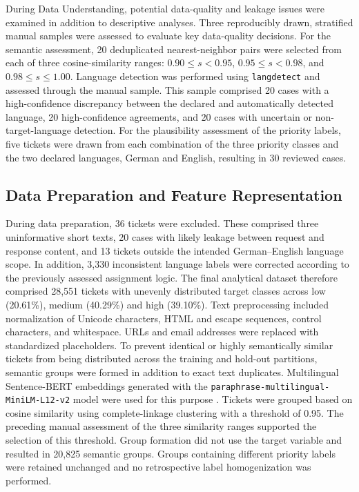 During Data Understanding, potential data-quality and leakage issues were examined in addition to descriptive analyses. Three reproducibly drawn, stratified manual samples were assessed to evaluate key data-quality decisions. For the semantic assessment, 20 deduplicated nearest-neighbor pairs were selected from each of three cosine-similarity ranges: $0.90 \leq s < 0.95$, $0.95 \leq s < 0.98$, and $0.98 \leq s \leq 1.00$. Language detection was performed using \texttt{langdetect} and assessed through the manual sample. This sample comprised 20 cases with a high-confidence discrepancy between the declared and automatically detected language, 20 high-confidence agreements, and 20 cases with uncertain or non-target-language detection. For the plausibility assessment of the priority labels, five tickets were drawn from each combination of the three priority classes and the two declared languages, German and English, resulting in 30 reviewed cases.

\subsection{Data Preparation and Feature Representation}

During data preparation, 36 tickets were excluded. These comprised three uninformative short texts, 20 cases with likely leakage between request and response content, and 13 tickets outside the intended German--English language scope. In addition, 3,330 inconsistent language labels were corrected according to the previously assessed assignment logic. The final analytical dataset therefore comprised 28,551 tickets with unevenly distributed target classes across low (20.61\%), medium (40.29\%) and high (39.10\%).
Text preprocessing included normalization of Unicode characters, HTML and escape sequences, control characters, and whitespace. URLs and email addresses were replaced with standardized placeholders. To prevent identical or highly semantically similar tickets from being distributed across the training and hold-out partitions, semantic groups were formed in addition to exact text duplicates. Multilingual Sentence-BERT embeddings generated with the \texttt{paraphrase-multilingual-MiniLM-L12-v2} model were used for this purpose \cite{reimers2019sentencebert,reimers2020multilingual}. Tickets were grouped based on cosine similarity using complete-linkage clustering with a threshold of 0.95. The preceding manual assessment of the three similarity ranges supported the selection of this threshold. Group formation did not use the target variable and resulted in 20,825 semantic groups. Groups containing different priority labels were retained unchanged and no retrospective label homogenization was performed.

